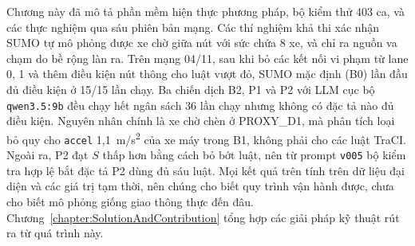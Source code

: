 \documentclass[../main.tex]{subfiles}
\begin{document}
Chương này đã mô tả phần mềm hiện thực phương pháp, bộ kiểm thử 403 ca, và các thực nghiệm qua sáu phiên bản mạng. Các thí nghiệm khả thi xác nhận SUMO tự mô phỏng được xe chờ giữa nút với sức chứa 8 xe, và chỉ ra nguồn va chạm do bề rộng làn ra. Trên mạng 04/11, sau khi bỏ các kết nối vi phạm từ lane 0, 1 và thêm điều kiện nút thông cho luật vượt đỏ, SUMO mặc định (B0) lần đầu đủ điều kiện ở 15/15 lần chạy. Ba chiến dịch B2, P1 và P2 với LLM cục bộ \texttt{qwen3.5:9b} đều chạy hết ngân sách 36 lần chạy nhưng không có đặc tả nào đủ điều kiện. Nguyên nhân chính là xe chờ chèn ở PROXY\_D1, mà phân tích loại bỏ quy cho \texttt{accel} 1,1~m/s\textsuperscript{2} của xe máy trong B1, không phải cho các luật TraCI. Ngoài ra, P2 đạt $S$ thấp hơn bằng cách bỏ bớt luật, nên từ prompt \texttt{v005} bộ kiểm tra hợp lệ bắt đặc tả P2 dùng đủ sáu luật. Mọi kết quả trên tính trên dữ liệu đại diện và các giá trị tạm thời, nên chúng cho biết quy trình vận hành được, chưa cho biết mô phỏng giống giao thông thực đến đâu. Chương~\ref{chapter:SolutionAndContribution} tổng hợp các giải pháp kỹ thuật rút ra từ quá trình này.
\end{document}
